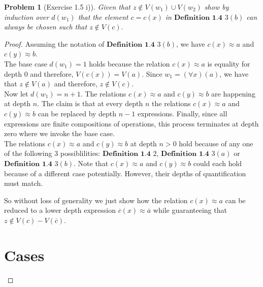\documentclass{article}
\theoremstyle{problemstyle}
\newtheorem{problem}{Problem}
\theoremstyle{lemmastyle}
\theoremstyle{theoremstyle}
\begin{document}
\begin{problem}[Exercise 1.5 i)]
Given that $z \notin V(w_1) \cup V(w_2)$ show by induction over $d(w_1)$ that the element $c = c(x)$ in $\textbf{Definition 1.4}$ $3 (b)$ can always be chosen such that $z \notin V(c).$
\end{problem}

\begin{proof}
Assuming the notation of $\textbf{Definition 1.4}$ $3 (b)$, we have $c(x) \approx a$ and $c(y) \approx b$.\\ 

The base case $d(w_1) = 1$ holds because the relation $c(x) \approx a$ is equality for depth $0$ and therefore, $V(c(x)) = V(a)$. Since $w_1 = (\forall x)(a)$, we have that $z \notin V(a)$ and therefore, $z \notin V(c)$.\\ 

Now let $d(w_1) = n+1$. The relations $c(x) \approx a$ and $c(y) \approx b$ are happening at depth $n$. The claim is that at every depth $n$ the relations $c(x) \approx a$ and $c(y) \approx b$ can be replaced by depth $n-1$ expressions. Finally, since all expressions are finite compositions of operations, this process terminates at depth zero where we invoke the base case.\\ 

The relations $c(x) \approx a$ and $c(y) \approx b$ at depth $n > 0$ hold because of any one of the following 3 possiblilities: $\textbf{Definition 1.4}$ $2$, $\textbf{Definition 1.4}$ $3 (a)$ or $\textbf{Definition 1.4}$ $3 (b)$.  Note that $c(x) \approx a$ and $c(y) \approx b$ could each hold because of a different case potentially. However, their depths of quantification must match. 

So without loss of generality we just show how the relation $c(x) \approx a$ can be reduced to a lower depth expression  $\overline{c}(x) \approx \overline{a}$ while guaranteeing that $z \notin V(c) - V(\overline{c})$. 

\section*{Cases}

\end{proof}
\end{document}
